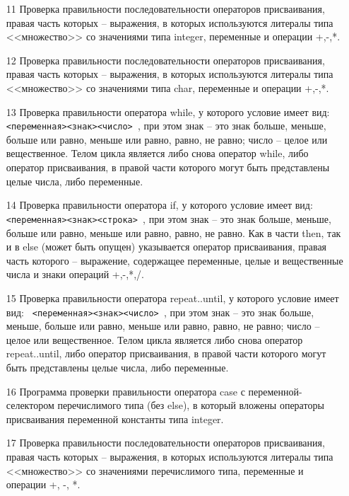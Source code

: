 \begin{enumerate}
\item[11] Проверка правильности последовательности операторов присваивания, правая часть которых -- выражения,
в которых используются литералы типа <<множество>> со значениями типа integer, переменные и операции +,-,*.

\item[12] Проверка правильности последовательности операторов присваивания, правая часть которых -- выражения,
в которых используются литералы типа <<множество>> со значениями типа char, переменные и операции +,-,*.

\item[13] Проверка правильности оператора while, у которого условие имеет вид: \verb| <переменная><знак><число> |,
при этом знак -- это знак больше, меньше, больше или равно, меньше или равно, равно, не равно; число -- целое или
вещественное. Телом цикла является либо снова оператор while, либо оператор присваивания, в правой части которого могут
быть представлены целые числа, либо переменные.

\item[14]
Проверка правильности оператора if, у которого условие имеет вид: \verb| <переменная><знак><строка> |,
при этом знак -- это знак больше, меньше, больше или равно, меньше или равно, равно, не равно. Как в части then, так и в
else (может быть опущен) указывается оператор присваивания, правая часть которого -- выражение, содержащее переменные, целые
и вещественные числа и знаки операций +,-,*,/.

\item[15] Проверка правильности оператора repeat..until,
у которого условие имеет вид: \verb| <переменная><знак><число> |,
при этом знак -- это знак больше, меньше, больше или равно, меньше или равно, равно, не равно; число -- целое или
вещественное. Телом цикла является либо снова оператор repeat..until, либо оператор присваивания, в правой части которого
могут быть представлены целые числа, либо переменные.

\item[16] Программа проверки правильности оператора case с переменной-селектором перечислимого типа (без else), в который
вложены операторы присваивания переменной константы типа integer.

\item[17] Проверка правильности последовательности операторов присваивания, правая часть которых -- выражения,
в которых используются литералы типа <<множество>> со значениями перечислимого типа, переменные и операции +, -, *.


\end{enumerate}
